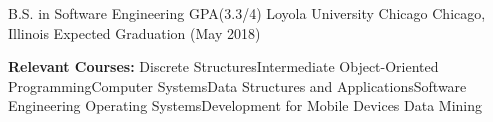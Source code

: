 \begin{cventries}
  \cventry
    {B.S. in Software Engineering GPA(3.3/4)}
    {Loyola University Chicago}
    {Chicago, Illinois}
    {Expected Graduation (May 2018)}
    {
      \begin{cvitems}
        \item {\textbf{Relevant Courses:}
        Discrete Structures\enskip\cdotp\enskip Intermediate Object-Oriented Programming\enskip\cdotp\enskip Computer Systems\enskip\cdotp\enskip Data Structures and Applications\enskip\cdotp\enskip Software Engineering \enskip\cdotp\enskip Operating Systems\enskip\cdotp\enskip Development for Mobile Devices \enskip\cdotp\enskip Data Mining }
      \end{cvitems}
    }
\end{cventries}
